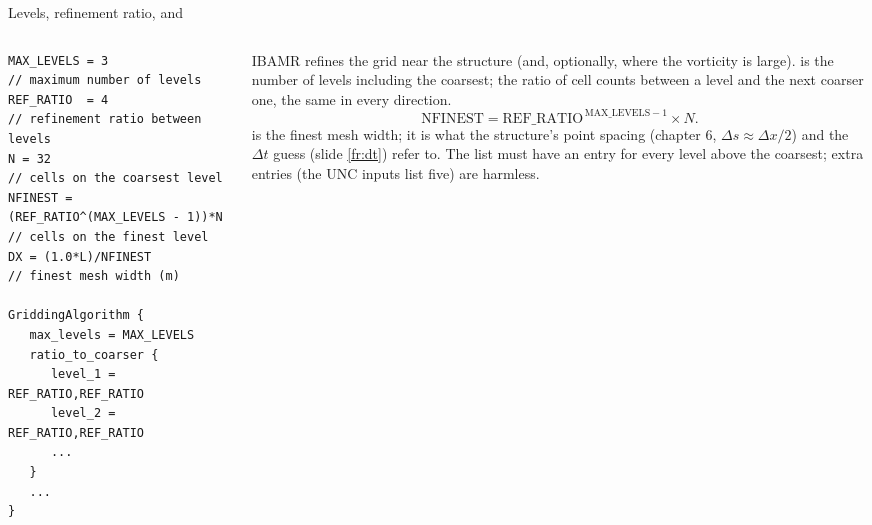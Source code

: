 \documentclass[aspectratio=169,11pt]{beamer}
\begin{document}
\begin{frame}[fragile]{Levels, refinement ratio,  and }
\label{fr:levels}
\begin{columns}[T,onlytextwidth]
\begin{column}{0.5\textwidth}
\begin{lstlisting}[style=inputtiny]
MAX_LEVELS = 3                            // maximum number of levels
REF_RATIO  = 4                            // refinement ratio between levels
N = 32                                    // cells on the coarsest level
NFINEST = (REF_RATIO^(MAX_LEVELS - 1))*N  // cells on the finest level
DX = (1.0*L)/NFINEST                      // finest mesh width (m)

GriddingAlgorithm {
   max_levels = MAX_LEVELS
   ratio_to_coarser {
      level_1 = REF_RATIO,REF_RATIO
      level_2 = REF_RATIO,REF_RATIO
      ...
   }
   ...
}
\end{lstlisting}
\end{column}
\begin{column}{0.48\textwidth}
\small IBAMR refines the grid near the structure (and, optionally, where the vorticity is large).  is the number of levels including the coarsest;  the ratio of cell counts between a level and the next coarser one, the same in every direction.
\[
  \mathrm{NFINEST} = \mathrm{REF\_RATIO}^{\,\mathrm{MAX\_LEVELS}-1}\times N .
\]
\small {} is the finest mesh width; it is what the structure's point spacing (chapter 6, $\Delta s \approx \Delta x/2$) and the $\Delta t$ guess (slide \ref{fr:dt}) refer to. The  list must have an entry for every level above the coarsest; extra entries (the UNC inputs list five) are harmless.
\end{column}
\end{columns}
\end{frame}
\end{document}

